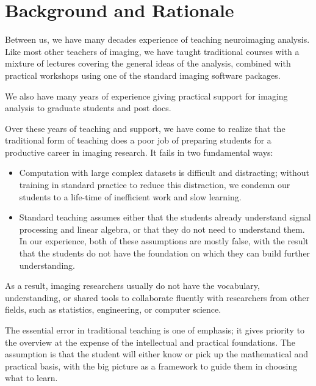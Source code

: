 \section{Background and Rationale}\label{background}

Between us, we have many decades experience of teaching neuroimaging analysis.
Like most other teachers of imaging, we have taught traditional courses with a
mixture of lectures covering the general ideas of the analysis, combined with
practical workshops using one of the standard imaging software packages.

We also have many years of experience giving practical support for imaging
analysis to graduate students and post docs.

Over these years of teaching and support, we have come to realize
that the traditional form of teaching does a poor job of preparing
students for a productive career in imaging research.  It fails in two
fundamental ways:

\begin{itemize}

\item
    Computation with large complex datasets is difficult and distracting;
        without training in standard practice to reduce this distraction, we
        condemn our students to a life-time of inefficient work and slow
        learning.

\item
    Standard teaching assumes either that the students already understand
        signal processing and linear algebra, or that they do not need to
        understand them.  In our experience, both of these assumptions are
        mostly false, with the result that the students do not have the
        foundation on which they can build further understanding.

\end{itemize}

As a result, imaging researchers usually do not have the vocabulary,
understanding, or shared tools to collaborate fluently with researchers from
other fields, such as statistics, engineering, or computer science.

The essential error in traditional teaching is one of emphasis;
it gives priority to the overview at the expense of the
intellectual and practical foundations.  The assumption is
that the student will either know or pick up the mathematical and
practical basis, with the big picture as a framework to guide them in
choosing what to learn.

